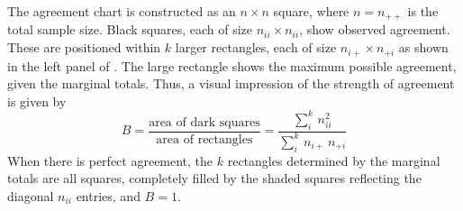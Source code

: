 \documentclass[11pt]{book}\usepackage[]{graphicx}\usepackage[]{color}
\begin{document}
The agreement chart is constructed as an \(n \times  n\) square,
where $n = n_{++}$ is the total sample size.  Black squares, each of size
\(n_{ii} \times  n_{ii}\), show observed agreement.  These are positioned
within $k$ larger rectangles, each of size \(n_{i+} \times  n_{+i}\)
as shown in the left panel of
.  The
large rectangle shows the maximum possible agreement, given the
marginal totals.  Thus, a visual impression of the strength of
agreement is given by
\begin{equation}\label{eq:bangb}
  B  =
  \frac{ \mbox{area of dark squares}}
  { \mbox{area of rectangles}}  =
  \frac{ \sum_i^k \,  n_{ii}^2 }
  { \sum_i^k \,  n_{i+} \,  n_{+i} }
\end{equation}
When there is perfect agreement, the $k$ rectangles determined by the
marginal totals are all squares, completely filled by the shaded squares
reflecting the diagonal $n_{ii}$ entries, and $B = 1$. 
\end{document}
